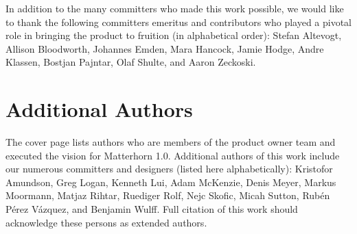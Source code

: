 \documentclass{sig-alternate}
\begin{document}
In addition to the many committers who made this work possible, we would like to thank the following committers emeritus and contributors who played a pivotal role in bringing the product to fruition (in alphabetical order): Stefan Altevogt, Allison Bloodworth, Johannes Emden, Mara Hancock, Jamie Hodge, Andre Klassen, Bostjan Pajntar, Olaf Shulte, and Aaron Zeckoski.



\section{Additional Authors}
The cover page lists authors who are members of the product owner team and executed the vision for Matterhorn 1.0.  Additional authors of this work include our numerous committers and designers (listed here alphabetically): Kristofor Amundson, Greg Logan, Kenneth Lui, Adam McKenzie, Denis Meyer, Markus Moormann, Matjaz Rihtar, Ruediger Rolf, Nejc Skofic, Micah Sutton, Rub\'{e}n P\'{e}rez V\'{a}zquez, and Benjamin Wulff.  Full citation of this work should acknowledge these persons as extended authors.
\end{document}
